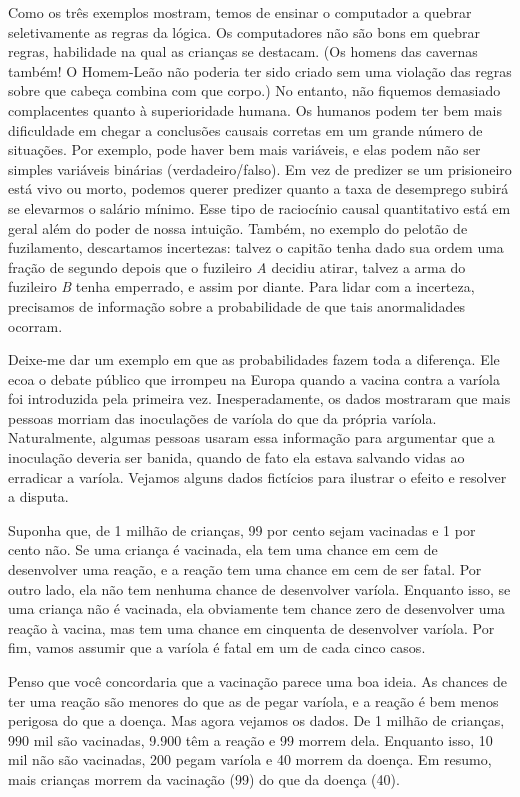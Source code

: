 \documentclass[11pt,a5paper,twoside]{book}
\begin{document}
Como os três exemplos mostram, temos de ensinar o computador a quebrar seletivamente as regras da lógica. Os computadores não são bons em quebrar regras, habilidade na qual as crianças se destacam. (Os homens das cavernas também! O Homem-Leão não poderia ter sido criado sem uma violação das regras sobre que cabeça combina com que corpo.) No entanto, não fiquemos demasiado complacentes quanto à superioridade humana. Os humanos podem ter bem mais dificuldade em chegar a conclusões causais corretas em um grande número de situações. Por exemplo, pode haver bem mais variáveis, e elas podem não ser simples variáveis binárias (verdadeiro/falso). Em vez de predizer se um prisioneiro está vivo ou morto, podemos querer predizer quanto a taxa de desemprego subirá se elevarmos o salário mínimo. Esse tipo de raciocínio causal quantitativo está em geral além do poder de nossa intuição. Também, no exemplo do pelotão de fuzilamento, descartamos incertezas: talvez o capitão tenha dado sua ordem uma fração de segundo depois que o fuzileiro \textit{A} decidiu atirar, talvez a arma do fuzileiro \textit{B} tenha emperrado, e assim por diante. Para lidar com a incerteza, precisamos de informação sobre a probabilidade de que tais anormalidades ocorram.

Deixe-me dar um exemplo em que as probabilidades fazem toda a diferença. Ele ecoa o debate público que irrompeu na Europa quando a vacina contra a varíola foi introduzida pela primeira vez. Inesperadamente, os dados mostraram que mais pessoas morriam das inoculações de varíola do que da própria varíola. Naturalmente, algumas pessoas usaram essa informação para argumentar que a inoculação deveria ser banida, quando de fato ela estava salvando vidas ao erradicar a varíola. Vejamos alguns dados fictícios para ilustrar o efeito e resolver a disputa.

Suponha que, de 1 milhão de crianças, 99 por cento sejam vacinadas e 1 por cento não. Se uma criança é vacinada, ela tem uma chance em cem de desenvolver uma reação, e a reação tem uma chance em cem de ser fatal. Por outro lado, ela não tem nenhuma chance de desenvolver varíola. Enquanto isso, se uma criança não é vacinada, ela obviamente tem chance zero de desenvolver uma reação à vacina, mas tem uma chance em cinquenta de desenvolver varíola. Por fim, vamos assumir que a varíola é fatal em um de cada cinco casos.

Penso que você concordaria que a vacinação parece uma boa ideia. As chances de ter uma reação são menores do que as de pegar varíola, e a reação é bem menos perigosa do que a doença. Mas agora vejamos os dados. De 1 milhão de crianças, 990 mil são vacinadas, 9.900 têm a reação e 99 morrem dela. Enquanto isso, 10 mil não são vacinadas, 200 pegam varíola e 40 morrem da doença. Em resumo, mais crianças morrem da vacinação (99) do que da doença (40).
\end{document}
